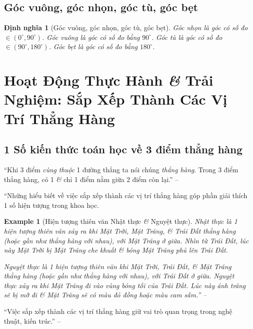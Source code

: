 \documentclass[oneside]{book}
\numberwithin{equation}{section}
\newtheorem{dinhnghia}{Định nghĩa}[section]
\newtheorem{example}{Example}[section]
\begin{document}
\subsection{Góc vuông, góc nhọn, góc tù, góc bẹt}

\begin{dinhnghia}[Góc vuông, góc nhọn, góc tù, góc bẹt]
	\emph{Góc nhọn} là góc có số đo $\in(0^\circ,90^\circ)$. \emph{Góc vuông} là góc có số đo bằng $90^\circ$. \emph{Góc tù} là góc có số đo $\in(90^\circ,180^\circ)$. \emph{Góc bẹt} là góc có số đo bằng $180^\circ$.
\end{dinhnghia}


\section{Hoạt Động Thực Hành \textit{\&} Trải Nghiệm: Sắp Xếp Thành Các Vị Trí Thẳng Hàng}

\subsection{1 Số kiến thức toán học về 3 điểm thẳng hàng}
``Khi 3 điểm \textit{cùng thuộc} 1 đường thẳng ta nói chúng \textit{thẳng hàng}. Trong 3 điểm thẳng hàng, có 1 \textit{\&} chỉ 1 điểm nằm giữa 2 điểm còn lại.'' -- \cite[p. 104]{Thai_Anh_Dat_Ha_Loan_Nam_Quang_Toan_6_tap_2}

``Những hiểu biết về việc sắp xếp thành các vị trí thẳng hàng góp phần giải thích 1 số hiện tượng trong khoa học.

\begin{example}[Hiện tượng thiên văn Nhật thực \textit{\&} Nguyệt thực]
	\emph{Nhật thực} là 1 hiện tượng thiên văn xảy ra khi Mặt Trời, Mặt Trăng, \textit{\&} Trái Đất thẳng hàng (hoặc gần như thẳng hàng với nhau), với Mặt Trăng ở giữa. Nhìn từ Trái Đất, lúc này Mặt Trời bị Mặt Trăng che khuất \textit{\&} bóng Mặt Trăng phủ lên Trái Đất.
	
	\emph{Nguyệt thực} là 1 hiện tượng thiên văn khi Mặt Trời, Trái Đất, \textit{\&} Mặt Trăng thẳng hàng (hoặc gần như thẳng hàng với nhau), với Trái Đất ở giữa. Nguyệt thực xảy ra khi Mặt Trăng đi vào vùng bóng tối của Trái Đất. Lúc này ánh trăng sẽ bị mờ đi \textit{\&} Mặt Trăng sẽ có màu đỏ đồng hoặc màu cam sẫm.'' -- \cite[p. 105]{Thai_Anh_Dat_Ha_Loan_Nam_Quang_Toan_6_tap_2}
\end{example}
``Việc sắp xếp thành các vị trí thẳng hàng giữ vai trò quan trọng trong nghệ thuật, kiến trúc.'' -- \cite[p. 106]{Thai_Anh_Dat_Ha_Loan_Nam_Quang_Toan_6_tap_2}
\end{document}

